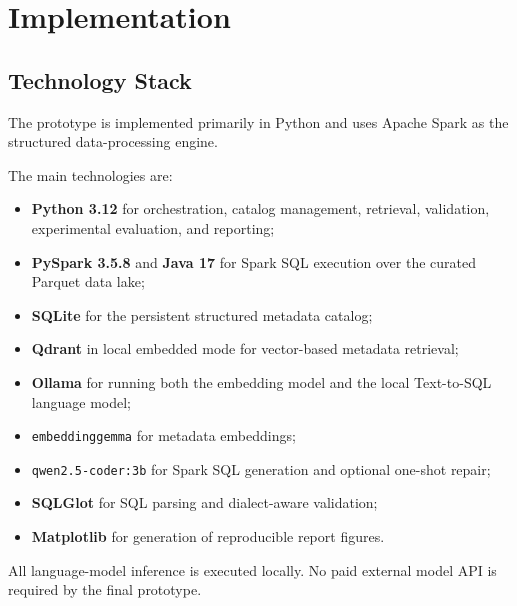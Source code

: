 \section{Implementation}
\label{sec:implementation}

\subsection{Technology Stack}

The prototype is implemented primarily in Python and uses Apache Spark as the
structured data-processing engine.

The main technologies are:

\begin{itemize}

    \item \textbf{Python 3.12} for orchestration, catalog management,
    retrieval, validation, experimental evaluation, and reporting;

    \item \textbf{PySpark 3.5.8} and \textbf{Java 17} for Spark SQL execution
    over the curated Parquet data lake;

    \item \textbf{SQLite} for the persistent structured metadata catalog;

    \item \textbf{Qdrant} in local embedded mode for vector-based metadata
    retrieval;

    \item \textbf{Ollama} for running both the embedding model and the local
    Text-to-SQL language model;

    \item \texttt{embeddinggemma} for metadata embeddings;

    \item \texttt{qwen2.5-coder:3b} for Spark SQL generation and optional
    one-shot repair;

    \item \textbf{SQLGlot} for SQL parsing and dialect-aware validation;

    \item \textbf{Matplotlib} for generation of reproducible report figures.

\end{itemize}

All language-model inference is executed locally. No paid external model API
is required by the final prototype.


